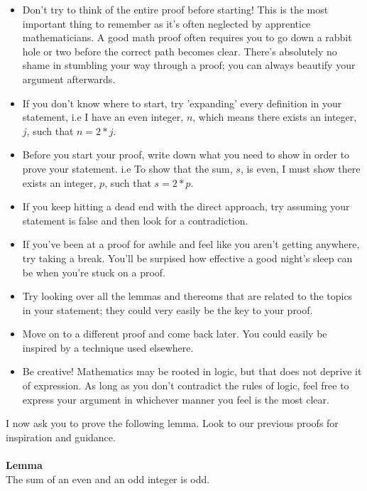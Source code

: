 \documentclass[a4paper,12pt]{article}
\begin{document}
\begin{itemize}
\item Don't try to think of the entire proof before starting! This is the most important thing to remember as it's often neglected by apprentice mathematicians. A good math proof often requires you to go down a rabbit hole or two before the correct path becomes clear. There's absolutely no shame in stumbling your way through a proof; you can always beautify your argument afterwards.    
\item If you don't know where to start, try 'expanding' every definition in your statement, i.e I have an even integer, $n$, which means there exists an integer, $j$, such that $n = 2*j$.
\item Before you start your proof, write down what you need to show in order to prove your statement. i.e To show that the sum, $s$, is even, I must show there exists an integer, $p$, such that $s = 2*p$.
\item If you keep hitting a dead end with the direct approach, try assuming your statement is false and then look for a contradiction.
\item If you've been at a proof for awhile and feel like you aren't getting anywhere, try taking a break. You'll be surpised how effective a good night's sleep can be when you're stuck on a proof.
\item Try looking over all the lemmas and thereoms that are related to the topics in your statement; they could very easily be the key to your proof.
\item Move on to a different proof and come back later. You could easily be inspired by a technique used elsewhere.
\item Be creative! Mathematics may be rooted in logic, but that does not deprive it of expression. As long as you don't contradict the rules of logic, feel free to express your argument in whichever manner you feel is the most clear.
\end{itemize}
I now ask you to prove the following lemma. Look to our previous proofs for inspiration and guidance.\\
\\
\textbf{Lemma}\\
The sum of an even and an odd integer is odd.\\
\end{document}
